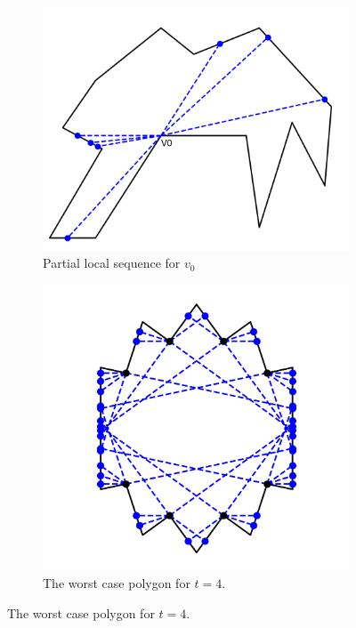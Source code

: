 \documentclass[]{svproc}  %
\begin{document}
\begin{figure}[h]
\centering
\begin{subfigure}{0.4\textwidth}
    \centering
    \includegraphics[width=\linewidth]{figures/partial_local_sequence.png}
    \caption{Partial local sequence for $v_0$}\label{fig:pls}
\end{subfigure}%
\begin{subfigure}{0.4\textwidth}
    \centering
    \includegraphics[width=\linewidth]{figures/chestnut_5.png}
    \caption{The worst case polygon for $t=4$. \label{fig:t4}}
\end{subfigure}
\end{figure}
\end{document}
